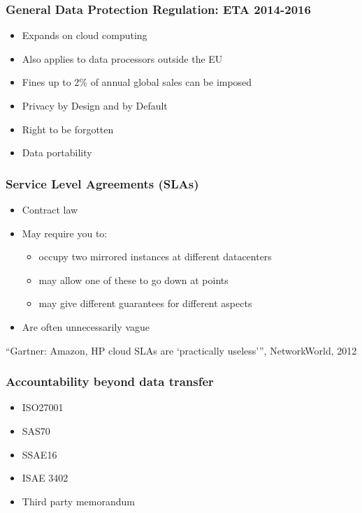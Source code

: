 \documentclass{beamer}
\begin{document}
\begin{frame}
    \frametitle{General Data Protection Regulation: ETA 2014-2016}
    \begin{itemize}
    \item Expands on cloud computing
    \item Also applies to data processors outside the EU
    \item Fines up to 2\% of annual global sales can be imposed
    \end{itemize}

    \begin{itemize}
    \item Privacy by Design and by Default
    \item Right to be forgotten
    \item Data portability
    \end{itemize}
\end{frame}

\begin{frame}
    \frametitle{Service Level Agreements (SLAs)}
    \begin{itemize}
    \item Contract law
    \item May require you to:
      \begin{itemize} %
        \item occupy two mirrored instances at different datacenters
        \item may allow one of these to go down at points
        \item may give different guarantees for different aspects
      \end{itemize}
    \item Are often unnecessarily vague
    \end{itemize}
    \footnotesize{``Gartner: Amazon, HP cloud SLAs are `practically useless''', NetworkWorld, 2012}
\end{frame}

\begin{frame}
    \frametitle{Accountability beyond data transfer}
    \begin{itemize}
    \item ISO27001
    \item SAS70 %
    \item SSAE16 %
    \item ISAE 3402 %
    \item Third party memorandum
    \end{itemize}
\end{frame}
\end{document}
